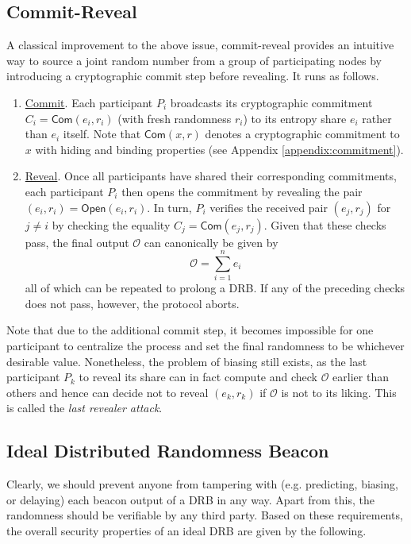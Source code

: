 \documentclass[letterpaper,twocolumn,10pt]{article}
\theoremstyle{definition}
\theoremstyle{remark}
\begin{document}
\subsection{Commit-Reveal}
\label{subsection:commit-reveal}
A classical improvement to the above issue, commit-reveal provides an intuitive way to source a joint random number from a group of participating nodes by introducing a cryptographic commit step before revealing. It runs as follows.
\begin{enumerate}
\item \underline{Commit}. Each participant $P_i$ broadcasts its cryptographic commitment $C_i = \mathsf{Com}(e_i, r_i)$ (with fresh randomness $r_i$) to its entropy share $e_i$ rather than $e_i$ itself. Note that $\mathsf{Com}(x, r)$ denotes a cryptographic commitment to $x$ with hiding and binding properties (see Appendix \ref{appendix:commitment}).
\item \underline{Reveal}. Once all participants have shared their corresponding commitments, each participant $P_i$ then opens the commitment by revealing the pair $(e_i, r_i) = \mathsf{Open}(e_i, r_i)$. In turn, $P_i$ verifies the received pair $(e_j, r_j)$ for $j \neq i$ by checking the equality $C_j = \mathsf{Com}(e_j, r_j)$. Given that these checks pass, the final output $\mathcal{O}$ can canonically be given by
\[
\mathcal{O} = \sum_{i = 1}^n e_i
\]
all of which can be repeated to prolong a DRB. If any of the preceding checks does not pass, however, the protocol aborts.
\end{enumerate}

Note that due to the additional commit step, it becomes impossible for one participant to centralize the process and set the final randomness to be whichever desirable value. Nonetheless, the problem of biasing still exists, as the last participant $P_k$ to reveal its share can in fact compute and check $\mathcal{O}$ earlier than others and hence can decide not to reveal $(e_k, r_k)$ if $\mathcal{O}$ is not to its liking. This is called the \textit{last revealer attack}.

\subsection{Ideal Distributed Randomness Beacon}
Clearly, we should prevent anyone from tampering with (e.g. predicting, biasing, or delaying) each beacon output of a DRB in any way. Apart from this, the randomness should be verifiable by any third party. Based on these requirements, the overall security properties of an ideal DRB are given by the following.
\end{document}
